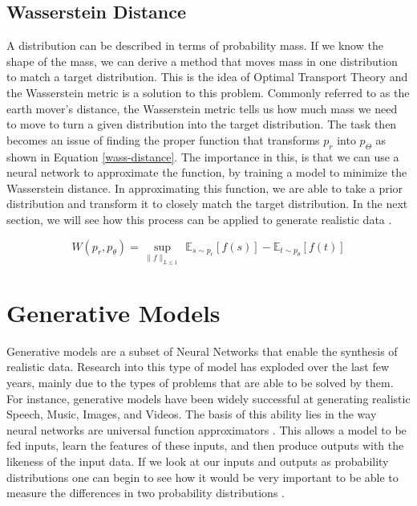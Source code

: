 \subsection{Wasserstein Distance}
\hspace{0.5in}A distribution can be described in terms of probability mass. If we know the shape of the mass, we can derive a method that moves mass in one distribution to match a target distribution. This is the idea of Optimal Transport Theory  and the Wasserstein metric is a solution to this problem. Commonly referred to as the earth mover's distance, the Wasserstein metric tells us how much mass we need to move to turn a given distribution into the target distribution. The task then becomes an issue of finding the proper function that transforms $p_r$ into $p_\Theta$ as shown in Equation \ref{wass-distance}. The importance in this, is that we can use a neural network to approximate the function, by training a model to minimize the Wasserstein distance. In approximating this function, we are able to take a prior distribution and transform it to closely match the target distribution. In the next section, we will see how this process can be applied to generate realistic data \cite{optimal-transport}.
\begin{center}
    \begin{equation}
    \label{wass-distance}
W(p_r, p_\theta) = \sup_{\lVert f \lVert_{L \leq 1}} \ \mathbb{E}_{s \sim p_r}[f(s)] - \mathbb{E}_{t \sim p_\theta}[f(t)]
    \end{equation}
\end{center}



\section{Generative Models}
\hspace{0.5in}Generative models are a subset of Neural Networks that enable the synthesis of realistic data. Research into this type of model has exploded over the last few years, mainly due to the types of problems that are able to be solved by them. For instance, generative models have been widely successful at generating realistic Speech, Music, Images, and Videos. The basis of this ability lies in the way neural networks are universal function approximators \cite{universal}. This allows a model to be fed inputs, learn the features of these inputs, and then produce outputs with the likeness of the input data. If we look at our inputs and outputs as probability distributions one can begin to see how it would be very important to be able to measure the differences in two probability distributions \cite{Goodfellow-et-al-2016}.


